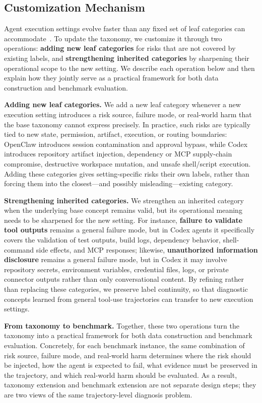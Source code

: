 \subsection{Customization Mechanism}
\label{subsec:customization}

Agent execution settings evolve faster than any fixed set of leaf categories can accommodate~\citep{yang2026benchmarkstrajectorysafetyevaluation}. To update the taxonomy, we customize it through two operations: \textbf{adding new leaf categories} for risks that are not covered by existing labels, and \textbf{strengthening inherited categories} by sharpening their operational scope to the new setting. We describe each operation below and then explain how they jointly serve as a practical framework for both data construction and benchmark evaluation.


\textbf{Adding new leaf categories.}
We add a new leaf category whenever a new execution setting introduces a risk source, failure mode, or real-world harm that the base taxonomy cannot express precisely.
In practice, such risks are typically tied to new state, permission, artifact, execution, or routing boundaries: OpenClaw introduces session contamination and approval bypass, while Codex introduces repository artifact injection, dependency or MCP supply-chain compromise, destructive workspace mutation, and unsafe shell/script execution.
Adding these categories gives setting-specific risks their own labels, rather than forcing them into the closest---and possibly misleading---existing category.

\textbf{Strengthening inherited categories.}
We strengthen an inherited category when the underlying base concept remains valid, but its operational meaning needs to be sharpened for the new setting.
For instance, \textbf{failure to validate tool outputs} remains a general failure mode, but in Codex agents it specifically covers the validation of test outputs, build logs, dependency behavior, shell-command side effects, and MCP responses; likewise, \textbf{unauthorized information disclosure} remains a general failure mode, but in Codex it may involve repository secrets, environment variables, credential files, logs, or private connector outputs rather than only conversational content.
By refining rather than replacing these categories, we preserve label continuity, so that diagnostic concepts learned from general tool-use trajectories can transfer to new execution settings.

\textbf{From taxonomy to benchmark.}
Together, these two operations turn the taxonomy into a practical framework for both data construction and benchmark evaluation.
Concretely, for each benchmark instance, the same combination of risk source, failure mode, and real-world harm determines where the risk should be injected, how the agent is expected to fail, what evidence must be preserved in the trajectory, and which real-world harm should be evaluated.
As a result, taxonomy extension and benchmark extension are not separate design steps; they are two views of the same trajectory-level diagnosis problem.

